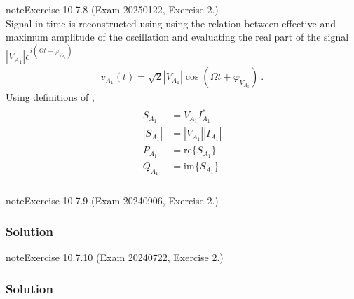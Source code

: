 \documentclass[letterpaper,10pt,italian]{jupyterBook}
\begin{document}
\begin{sphinxadmonition}{note}{Exercise 10.7.8 (Exam 2025\sphinxhyphen{}01\sphinxhyphen{}22, Exercise 2.)}
\begin{equation*}
\end{equation*}
\sphinxAtStartPar
Signal in time is reconstructed using using the relation between effective and maximum amplitude of the oscillation and evaluating the real part of the signal \(|V_{A_1}| e^{i(\Omega t + \varphi_{V_{A_1}})}\)
\begin{equation*}
\begin{split}v_{A_1}(t) = \sqrt{2} |V_{A_1}| \cos(\Omega t + \varphi_{V_{A_1}}) \ .\end{split}
\end{equation*}
\sphinxAtStartPar
{} Using definitions of {\hyperref[\detokenize{ch/electrical-engineering-networks-harmonic:classical-electromagnetism-electrical-engineering-newtork-analysis-harmonic-power}]{}},
\begin{equation*}
\begin{split}\begin{aligned}
   S_{A_1}  & = V_{A_1} I_{A_1}^* \\
  |S_{A_1}| & = |V_{A_1}| |I_{A_1}| \\
   P_{A_1}  & = \text{re} \{ S_{A_1} \} \\
   Q_{A_1}  & = \text{im} \{ S_{A_1} \} \\
\end{aligned}\end{split}
\end{equation*}\end{sphinxadmonition}
 \label{exercise:exam-24-09-06-exe-02}

\begin{sphinxadmonition}{note}{Exercise 10.7.9 (Exam 2024\sphinxhyphen{}09\sphinxhyphen{}06, Exercise 2.)}



\begin{figure}[htbp]
\centering

\noindent{}
\end{figure}
\subsubsection*{Solution}
\end{sphinxadmonition}
 \label{exercise:exam-24-07-22-exe-02}

\begin{sphinxadmonition}{note}{Exercise 10.7.10 (Exam 2024\sphinxhyphen{}07\sphinxhyphen{}22, Exercise 2.)}



\begin{figure}[htbp]
\centering

\noindent{}
\end{figure}
\subsubsection*{Solution}
\end{sphinxadmonition}
\end{document}
